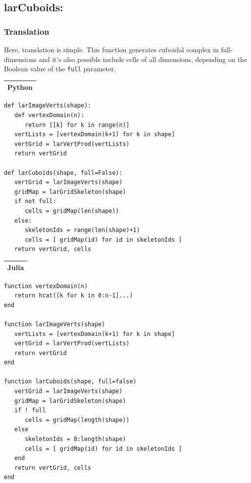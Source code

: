 \documentclass{article}
\begin{document}
\subsection{larCuboids:}

\subsubsection{Translation}
Here, translation is simple. This function generates cuboidal complex in full-dimensions and it's also possible include cells of all dimensions, depending on the Boolean value of the \texttt{full} parameter.
\vspace{1ex}
\begin{flushleft} \small
\begin{center}
\begin{tabular}{|p{16cm}|}
\hline
\cellcolor[gray]{.9}Python\\
\hline
\end{tabular}
\end{center}
\vspace{2ex}
\begin{list}{}{} \item
\begin{Verbatim}[tabsize=4]
def larImageVerts(shape):
   def vertexDomain(n): 
      return [[k] for k in range(n)]
   vertLists = [vertexDomain(k+1) for k in shape]
   vertGrid = larVertProd(vertLists)
   return vertGrid

def larCuboids(shape, full=False):
   vertGrid = larImageVerts(shape)
   gridMap = larGridSkeleton(shape)
   if not full: 
      cells = gridMap(len(shape))
   else:
      skeletonIds = range(len(shape)+1)
      cells = [ gridMap(id) for id in skeletonIds ]
   return vertGrid, cells
\end{Verbatim}
\end{list}
\begin{center}
\vspace{2ex}
\begin{tabular}{|p{16cm}|}
\hline
\cellcolor[gray]{.9}Julia\\
\hline
\end{tabular}
\end{center}
\vspace{2ex}
\begin{list}{}{} \item
\begin{Verbatim}[tabsize=4]
function vertexDomain(n)
   return hcat([k for k in 0:n-1]...)
end

function larImageVerts(shape)
   vertLists = [vertexDomain(k+1) for k in shape]
   vertGrid = larVertProd(vertLists)
   return vertGrid
end

function larCuboids(shape, full=false)
   vertGrid = larImageVerts(shape)
   gridMap = larGridSkeleton(shape)
   if ! full
      cells = gridMap(length(shape))
   else
      skeletonIds = 0:length(shape)
      cells = [ gridMap(id) for id in skeletonIds ]
   end
   return vertGrid, cells
end
\end{Verbatim}
\end{list}

\end{flushleft}
\end{document}
